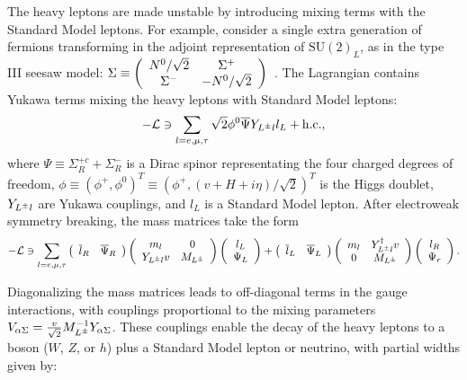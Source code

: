 The heavy leptons are made unstable by introducing mixing terms with the Standard Model leptons. For example, consider a single extra generation of fermions transforming in the adjoint representation of $\mathrm{SU}(2)_L$, as in the type III seesaw model: $\Sigma\equiv \left(\begin{array}{cc} N^{0}/\sqrt{2} & \Sigma^+ \\ \Sigma^- & -N^{0}/\sqrt{2}\end{array}\right)$~\cite{Abada:2008ea,Biggio:2011ja}. The Lagrangian contains Yukawa terms mixing the heavy leptons with Standard Model leptons:
\begin{equation}
  -\mathcal{L} \ni \sum_{l=e,\mu,\tau} \sqrt{2}\phi^0 \overline{\Psi} Y_{L^{\pm} l} l_L + \mathrm{h.c.},
\end{equation}
where $\Psi\equiv \Sigma^{+c}_R + \Sigma^-_R$ is a Dirac spinor representating the four charged degrees of freedom, $\phi\equiv(\phi^+,\phi^0)^T\equiv (\phi^+,(v+H+i\eta)/\sqrt{2})^T$ is the Higgs doublet, $Y_{L^{\pm} l}$ are Yukawa couplings, and $l_L$ is a Standard Model lepton. After electroweak symmetry breaking, the mass matrices take the form
\begin{equation}
-\mathcal{L} \ni \sum_{l=e,\mu,\tau} \left(\begin{array}{cc}\overline{l}_R & \overline{\Psi}_R \end{array} \right) \left(\begin{array}{cc} m_l & 0 \\ Y_{L^{\pm} l}v & M_{L^{\pm}} \end{array}\right) \left(\begin{array}{c} l_L \\ \Psi_L \end{array}\right)  + \left(\begin{array}{cc}\overline{l}_L & \overline{\Psi}_L\end{array}\right) \left(\begin{array}{cc} m_l & Y_{L^{\pm} l}^{\dagger}v \\ 0 & M_{L^{\pm}} \end{array}\right) \left(\begin{array}{c} l_R \\ \Psi_r \end{array}\right).
\end{equation}

Diagonalizing the mass matrices leads to off-diagonal terms in the gauge interactions, with couplings proportional to the mixing parameters $V_{\alpha\Sigma}=\frac{v}{\sqrt{2}} M_{L^{\pm}}^{-1} Y_{\alpha\Sigma}$. These couplings enable the decay of the heavy leptons to a boson ($W$, $Z$, or $h$) plus a Standard Model lepton or neutrino, with partial widths given by:

